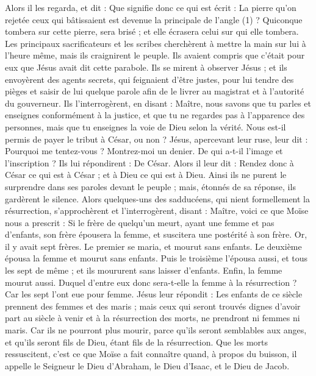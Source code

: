 \begin{multicols}{2}
Alors il les regarda, et dit : Que signifie donc ce qui est écrit : La pierre qu’on rejetée ceux qui bâtissaient est devenue la principale de l’angle (1) ?
Quiconque tombera sur cette pierre, sera brisé ; et elle écrasera celui sur qui elle tombera.
Les principaux sacrificateurs et les scribes cherchèrent à mettre la main sur lui à l’heure même, mais ils craignirent le peuple. Ils avaient compris que c’était pour eux que Jésus avait dit cette parabole.
Ils se mirent à observer Jésus ; et ils envoyèrent des agents secrets, qui feignaient d’être justes, pour lui tendre des pièges et saisir de lui quelque parole afin de le livrer au magistrat et à l’autorité du gouverneur.
Ils l'interrogèrent, en disant : Maître, nous savons que tu parles et enseignes conformément à la justice, et que tu ne regardes pas à l'apparence des personnes, mais que tu enseignes la voie de Dieu selon la vérité.
Nous est-il permis de payer le tribut à César, ou non ?
Jésus, apercevant leur ruse, leur dit : Pourquoi me tentez-vous ?
Montrez-moi un denier. De qui a-t-il l'image et l'inscription ? Ils lui répondirent : De César.
Alors il leur dit : Rendez donc à César ce qui est à César ; et à Dieu ce qui est à Dieu.
Ainsi ils ne purent le surprendre dans ses paroles devant le peuple ; mais, étonnés de sa réponse, ils gardèrent le silence.
\TextTitle{[La résurrection]}
Alors quelques-uns des sadducéens, qui nient formellement la résurrection, s'approchèrent et l'interrogèrent,
disant : Maître, voici ce que Moïse nous a prescrit : Si le frère de quelqu'un meurt, ayant une femme et pas d’enfants, son frère épousera la femme, et suscitera une postérité à son frère.
Or, il y avait sept frères. Le premier se maria, et mourut sans enfants.
Le deuxième épousa la femme et mourut sans enfants.
Puis le troisième l’épousa aussi, et tous les sept de même ; et ils moururent sans laisser d’enfants.
Enfin, la femme mourut aussi.
Duquel d’entre eux donc sera-t-elle la femme à la résurrection ? Car les sept l'ont eue pour femme.
Jésus leur répondit : Les enfants de ce siècle prennent des femmes et des maris ;
mais ceux qui seront trouvés dignes d’avoir part au siècle à venir et à la résurrection des morts, ne prendront ni femmes ni maris.
Car ils ne pourront plus mourir, parce qu'ils seront semblables aux anges, et qu'ils seront fils de Dieu, étant fils de la résurrection.
Que les morts ressuscitent, c’est ce que Moïse a fait connaître quand, à propos du buisson, il appelle le Seigneur le Dieu d'Abraham, le Dieu d'Isaac, et le Dieu de Jacob.

\end{multicols}
